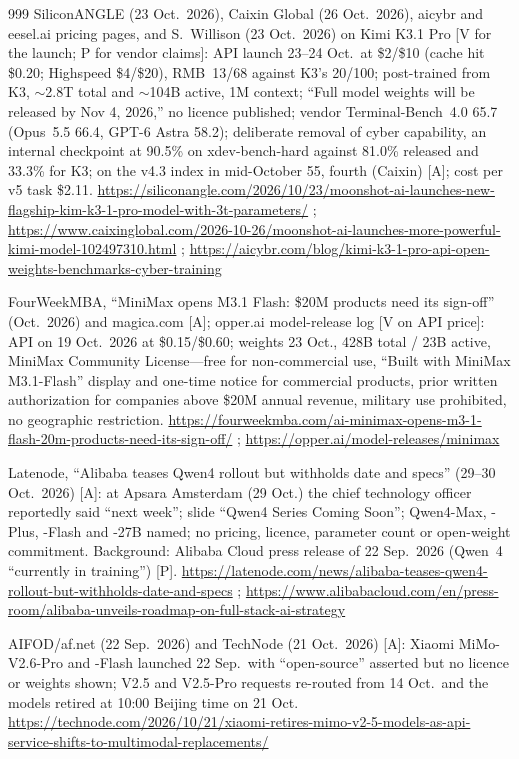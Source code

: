 \begin{thebibliography}{999}
 SiliconANGLE (23 Oct.\ 2026), Caixin Global (26 Oct.\ 2026), aicybr and eesel.ai pricing pages, and S.~Willison (23 Oct.\ 2026) on Kimi K3.1 Pro [V for the launch; P for vendor claims]: API launch 23--24 Oct.\ at \$2/\$10 (cache hit \$0.20; Highspeed \$4/\$20), RMB~13/68 against K3's 20/100; post-trained from K3, $\sim$2.8T total and $\sim$104B active, 1M context; ``Full model weights will be released by Nov 4, 2026,'' no licence published; vendor Terminal-Bench~4.0 65.7 (Opus~5.5 66.4, GPT-6 Astra 58.2); deliberate removal of cyber capability, an internal checkpoint at 90.5\% on xdev-bench-hard against 81.0\% released and 33.3\% for K3; on the v4.3 index in mid-October 55, fourth (Caixin) [A]; cost per v5 task \$2.11. \url{https://siliconangle.com/2026/10/23/moonshot-ai-launches-new-flagship-kim-k3-1-pro-model-with-3t-parameters/} ; \url{https://www.caixinglobal.com/2026-10-26/moonshot-ai-launches-more-powerful-kimi-model-102497310.html} ; \url{https://aicybr.com/blog/kimi-k3-1-pro-api-open-weights-benchmarks-cyber-training}

 FourWeekMBA, ``MiniMax opens M3.1 Flash: \$20M products need its sign-off'' (Oct.\ 2026) and magica.com [A]; opper.ai model-release log [V on API price]: API on 19 Oct.\ 2026 at \$0.15/\$0.60; weights 23 Oct., 428B total / 23B active, MiniMax Community License---free for non-commercial use, ``Built with MiniMax M3.1-Flash'' display and one-time notice for commercial products, prior written authorization for companies above \$20M annual revenue, military use prohibited, no geographic restriction. \url{https://fourweekmba.com/ai-minimax-opens-m3-1-flash-20m-products-need-its-sign-off/} ; \url{https://opper.ai/model-releases/minimax}

 Latenode, ``Alibaba teases Qwen4 rollout but withholds date and specs'' (29--30 Oct.\ 2026) [A]: at Apsara Amsterdam (29 Oct.) the chief technology officer reportedly said ``next week''; slide ``Qwen4 Series Coming Soon''; Qwen4-Max, -Plus, -Flash and -27B named; no pricing, licence, parameter count or open-weight commitment. Background: Alibaba Cloud press release of 22 Sep.\ 2026 (Qwen~4 ``currently in training'') [P]. \url{https://latenode.com/news/alibaba-teases-qwen4-rollout-but-withholds-date-and-specs} ; \url{https://www.alibabacloud.com/en/press-room/alibaba-unveils-roadmap-on-full-stack-ai-strategy}

 AIFOD/af.net (22 Sep.\ 2026) and TechNode (21 Oct.\ 2026) [A]: Xiaomi MiMo-V2.6-Pro and -Flash launched 22 Sep.\ with ``open-source'' asserted but no licence or weights shown; V2.5 and V2.5-Pro requests re-routed from 14 Oct.\ and the models retired at 10:00 Beijing time on 21 Oct. \url{https://technode.com/2026/10/21/xiaomi-retires-mimo-v2-5-models-as-api-service-shifts-to-multimodal-replacements/}


\end{thebibliography}
